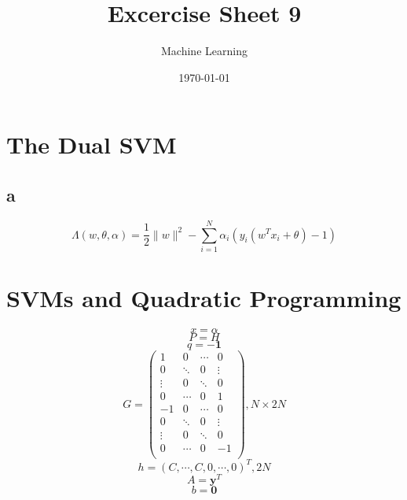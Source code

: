 \documentclass[11pt,abstract=on]{scrartcl}
\title{Excercise Sheet 9}
\subtitle{Machine Learning}
\date{\today}
\begin{document}
\maketitle
\section{The Dual SVM}
\subsection{a}
\begin{equation*}
\Lambda(w,\theta,\alpha) = \frac{1}{2}  \lVert w \rVert^2 - \sum\limits_{i=1}^{N} \alpha_{i}(y_{i}(w^T x_{i} + \theta)-1)
\end{equation*}

\section{SVMs and Quadratic Programming}
\begin{equation*}
x= \alpha
\end{equation*}
\begin{equation*}
P=H
\end{equation*}
\begin{equation*}
q=-\boldsymbol{1}
\end{equation*}
\begin{equation*}
G=\left( \begin{array}{rrrr}
1 & 0 & \cdots & 0 \\
0 & \ddots & 0 & \vdots \\
\vdots & 0 & \ddots & 0 \\
0 & \cdots & 0 & 1 \\
-1 & 0 & \cdots & 0 \\
0 & \ddots & 0 & \vdots \\
\vdots & 0 & \ddots & 0 \\
0 & \cdots & 0 & -1 \\
\end{array}\right), N\times 2N 
\end{equation*}
\begin{equation*}
 h = (C,\cdots,C,0,\cdots,0)^T,2N
\end{equation*}
\begin{equation*}
A=\boldsymbol{y}^T
\end{equation*}
\begin{equation*}
b = \boldsymbol{0}
\end{equation*}
\end{document}
